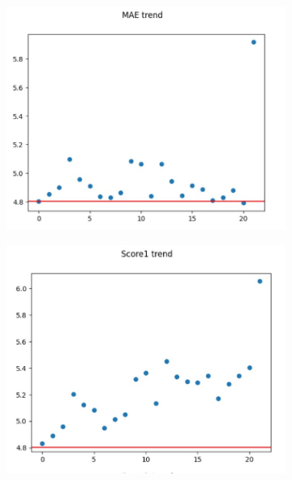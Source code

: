 \documentclass[
	letterpaper,
	a4paper,
	cleardoublepage=empty,
	headings=twolinechapter,
	numbers=autoenddot,
]{article}
\begin{document}
	\begin{figure}[h]
		\centering
		\begin{subfigure}{.5\textwidth}
			\centering
			\includegraphics[width=0.7\linewidth]{ImageFiles/mae_bnn_mae}
			\caption{}
			\label{fig:mae_bnn_mae}
		\end{subfigure}%
		\begin{subfigure}{.5\textwidth}
			\centering
			\includegraphics[width=0.7\linewidth]{ImageFiles/mae_bnn_eff1}
			\caption{}
			\label{fig:mae_bnn_eff1}
		\end{subfigure}
	

\end{figure}
\end{document}
